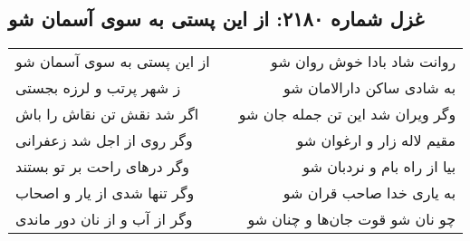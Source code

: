 \begin{center}
\section*{غزل شماره ۲۱۸۰: از این پستی به سوی آسمان شو}
\label{sec:2180}
\begin{longtable}{l p{0.5cm} r}
از این پستی به سوی آسمان شو
&&
روانت شاد بادا خوش روان شو
\\
ز شهر پرتب و لرزه بجستی
&&
به شادی ساکن دارالامان شو
\\
اگر شد نقش تن نقاش را باش
&&
وگر ویران شد این تن جمله جان شو
\\
وگر روی از اجل شد زعفرانی
&&
مقیم لاله زار و ارغوان شو
\\
وگر درهای راحت بر تو بستند
&&
بیا از راه بام و نردبان شو
\\
وگر تنها شدی از یار و اصحاب
&&
به یاری خدا صاحب قران شو
\\
وگر از آب و از نان دور ماندی
&&
چو نان شو قوت جان‌ها و چنان شو
\\
\end{longtable}
\end{center}
